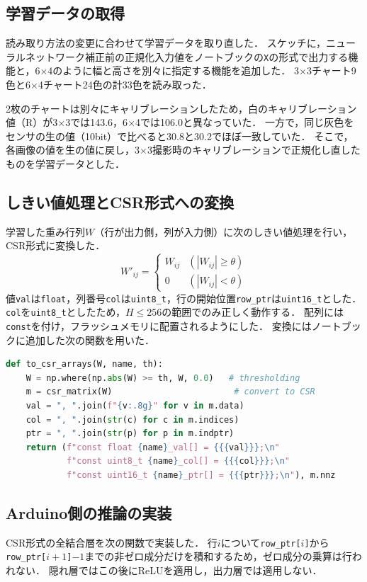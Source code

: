 \documentclass[a4paper,11pt,uplatex,dvipdfmx]{jsarticle}
\begin{document}
\subsection{学習データの取得}
読み取り方法の変更に合わせて学習データを取り直した．
スケッチに，ニューラルネットワーク補正前の正規化入力値をノートブックの\texttt{X}の形式で出力する機能と，6$\times$4のように幅と高さを別々に指定する機能を追加した．
3$\times$3チャート9色と6$\times$4チャート24色の計33色を読み取った．

2枚のチャートは別々にキャリブレーションしたため，白のキャリブレーション値（R）が3$\times$3では143.6，6$\times$4では106.0と異なっていた．
一方で，同じ灰色をセンサの生の値（10bit）で比べると30.8と30.2でほぼ一致していた．
そこで，各画像の値を生の値に戻し，3$\times$3撮影時のキャリブレーションで正規化し直したものを学習データとした．

\subsection{しきい値処理とCSR形式への変換}
学習した重み行列$W$（行が出力側，列が入力側）に次のしきい値処理を行い，CSR形式に変換した．
\begin{equation}
  W'_{ij} =
  \begin{cases}
    W_{ij} & (|W_{ij}| \geq \theta) \\
    0      & (|W_{ij}| < \theta)
  \end{cases}
\end{equation}
値\texttt{val}は\texttt{float}，列番号\texttt{col}は\texttt{uint8\_t}，行の開始位置\texttt{row\_ptr}は\texttt{uint16\_t}とした．
\texttt{col}を\texttt{uint8\_t}としたため，$H \leq 256$の範囲でのみ正しく動作する．
配列には\texttt{const}を付け，フラッシュメモリに配置されるようにした．
変換にはノートブックに追加した次の関数を用いた．

\begin{lstlisting}[language=Python]
def to_csr_arrays(W, name, th):
    W = np.where(np.abs(W) >= th, W, 0.0)   # thresholding
    m = csr_matrix(W)                        # convert to CSR
    val = ", ".join(f"{v:.8g}" for v in m.data)
    col = ", ".join(str(c) for c in m.indices)
    ptr = ", ".join(str(p) for p in m.indptr)
    return (f"const float {name}_val[] = {{{val}}};\n"
            f"const uint8_t {name}_col[] = {{{col}}};\n"
            f"const uint16_t {name}_ptr[] = {{{ptr}}};\n"), m.nnz
\end{lstlisting}

\subsection{Arduino側の推論の実装}
CSR形式の全結合層を次の関数で実装した．
行$i$について\texttt{row\_ptr[$i$]}から\texttt{row\_ptr[$i+1$]}$-1$までの非ゼロ成分だけを積和するため，ゼロ成分の乗算は行われない．
隠れ層ではこの後にReLUを適用し，出力層では適用しない．
\end{document}
